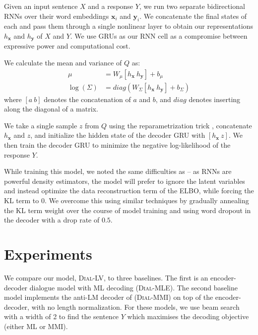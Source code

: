 Given an input sentence $X$ and a response $Y$, we run two separate bidirectional RNNs over their word embeddings $\mathbf{x}_i$ and $\mathbf{y}_i$. We concatenate the final states of each and pass them through a single nonlinear layer to obtain our representations $h_{\mathbf{x}}$ and $h_{\mathbf{y}}$ of $X$ and $Y$. We use GRUs \citep{GRU} as our RNN cell as a compromise between expressive power and computational cost.

We calculate the mean and variance of $Q$ as:
\begin{equation}
\begin{split}
   \mu & = W_{\mu} [h_{\mathbf{x}} \ h_{\mathbf{y}}] + b_{\mu} \\
   \log(\Sigma) & = diag(W_{\Sigma} [h_{\mathbf{x}} \ h_{\mathbf{y}}] + b_{\Sigma})
\end{split}
\end{equation}
where $[a \ b]$ denotes the concatenation of $a$ and $b$, and $diag$ denotes inserting along the diagonal of a matrix.

We take a single sample $z$ from $Q$ using the reparametrization trick \citep{Kingma:14}, concatenate $h_{\mathbf{x}}$ and $z$, and initialize the hidden state of the decoder GRU with $[h_{\mathbf{x}} \ z]$. We then train the decoder GRU to minimize the negative log-likelihood of the response $Y$.

While training this model, we noted the same difficulties as \citet{Bowman:16} -- as RNNs are powerful density estimators, the model will prefer to ignore the latent variables and instead optimize the data reconstruction term of the ELBO, while forcing the KL term to 0. We overcome this using similar techniques by gradually annealing the KL term weight over the course of model training and using word dropout in the decoder with a drop rate of $0.5$.

\section{Experiments}

We compare our model, \textsc{Dial-LV}, to three baselines. The first is an encoder-decoder dialogue model with ML decoding (\textsc{Dial-MLE}). The second baseline model implements the anti-LM decoder of \citet{Jiwei:16} (\textsc{Dial-MMI}) on top of the encoder-decoder, with no length normalization. For these models, we use beam search with a width of 2 to find the sentence $Y$ which maximises the decoding objective (either ML or MMI).

